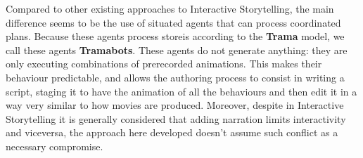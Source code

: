 \documentclass[
		twoside,openright,titlepage,numbers=noenddot,manychapters,
		headinclude,%
                footinclude=false,cleardoublepage=empty,
                BCOR=5mm,
		fontsize=11pt, %
                 enabledeprecatedfontcommands]{scrreprt}
\begin{document}

 




Compared to other existing approaches to Interactive Storytelling, the main difference seems to be the use of situated agents that can process coordinated plans. Because these agents process storeis according to the \textbf{Trama} model, we call these agents \textbf{Tramabots}. These agents do not generate anything: they are only executing combinations of prerecorded animations. This makes their behaviour predictable, and allows the authoring process to consist in writing a script, staging it to have the animation of all the behaviours and then edit it in a way very similar to how movies are produced. 
Moreover, despite in Interactive Storytelling  it is generally considered that adding narration limits interactivity and viceversa, the approach here developed doesn't assume such conflict as a necessary  compromise. %
\end{document}
